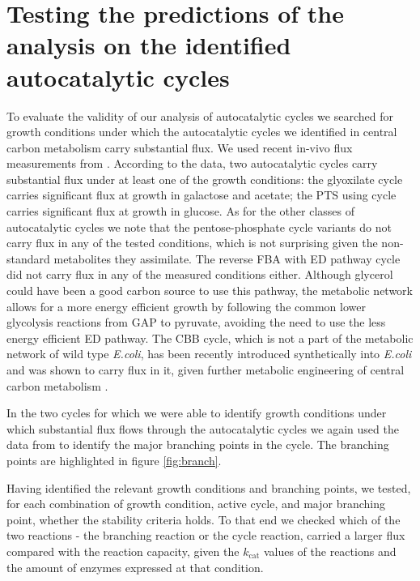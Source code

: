 \documentclass[a4page,notitlepage]{article}
\begin{document}
    \section{Testing the predictions of the analysis on the identified autocatalytic cycles}
    To evaluate the validity of our analysis of autocatalytic cycles we searched for growth conditions under which the autocatalytic cycles we identified in central carbon metabolism carry substantial flux.
    We used recent in-vivo flux measurements from \cite{Gerosa2015-oq}.
    According to the data, two autocatalytic cycles carry substantial flux under at least one of the growth conditions:
    the glyoxilate cycle carries significant flux at growth in galactose and acetate;
    the PTS using cycle carries significant flux at growth in glucose.
    As for the other classes of autocatalytic cycles we note that the pentose-phosphate cycle variants do not carry flux in any of the tested conditions, which is not surprising given the non-standard metabolites they assimilate.
    The reverse FBA with ED pathway cycle did not carry flux in any of the measured conditions either.
    Although glycerol could have been a good carbon source to use this pathway, the metabolic network allows for a more energy efficient growth by following the common lower glycolysis reactions from GAP to pyruvate, avoiding the need to use the less energy efficient ED pathway.
    The CBB cycle, which is not a part of the metabolic network of wild type \emph{E.coli},  has been recently introduced synthetically into \emph{E.coli} and was shown to carry flux in it, given further metabolic engineering of central carbon metabolism \cite{Antonovski2016}.

    In the two cycles for which we were able to identify growth conditions under which substantial flux flows through the autocatalytic cycles we again used the data from \cite{Gerosa2015-oq} to identify the major branching points in the cycle.
    The branching points are highlighted in figure \ref{fig:branch}.

    Having identified the relevant growth conditions and branching points, we tested, for each combination of growth condition, active cycle, and major branching point, whether the stability criteria holds.
    To that end we checked which of the two reactions - the branching reaction or the cycle reaction, carried a larger flux compared with the reaction capacity, given the $k_\text{cat}$ values of the reactions and the amount of enzymes expressed at that condition.
\end{document}
